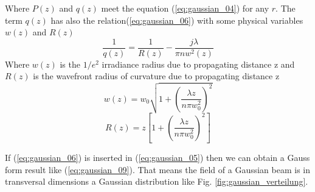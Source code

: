 Where $P(z)$ and $q(z)$ meet the equation (\ref{eq:gaussian_04}) for any $r$. The term $q(z)$ has also the relation(\ref{eq:gaussian_06}) with some physical variables $w(z)$ and $R(z)$
\begin{equation}
\frac{1}{q(z)}=\frac{1}{R(z)}-\frac{j\lambda}{\pi nw^{2}(z)}
\label{eq:gaussian_06}
\end{equation}
Where $w(z)$ is the $1/e^2$ irradiance radius due to propagating distance z and $R(z)$ is the wavefront radius of curvature due to propagating distance z
\begin{equation}
w(z)=w_{0}\sqrt{1+(\frac{\lambda z}{n\pi w^{2}_{0}})^{2}}
\label{eq:gaussian_07}
\end{equation}
\begin{equation}
R(z)=z\left[1+(\frac{\lambda z}{n\pi w^{2}_{0}})^{2}\right]
\label{eq:gaussian_08}
\end{equation}

If (\ref{eq:gaussian_06}) is inserted in (\ref{eq:gaussian_05}) then we can obtain a Gauss form result like (\ref{eq:gaussian_09}). That means the field of a Gaussian beam is in transversal dimensions a Gaussian distribution like Fig. \ref{fig:gaussian_verteilung}.\\

